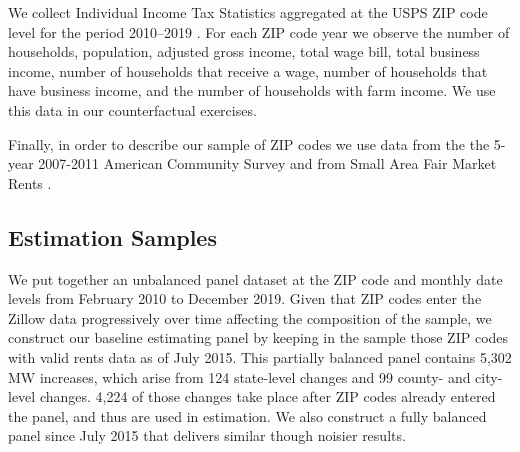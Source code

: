 We collect Individual Income Tax Statistics aggregated at the USPS ZIP code 
level for the period 2010--2019 \parencite{IRS}.
For each ZIP code year we observe the number of households, population, adjusted 
gross income, total wage bill, total business income, number of households that 
receive a wage, number of households that have business income, and the number 
of households with farm income.
We use this data in our counterfactual exercises.

Finally, in order to describe our sample of ZIP codes we use data from the 
the 5-year 2007-2011 American Community Survey \parencite[ACS;][]{ACS} and from 
Small Area Fair Market Rents \parencite[SAFMR;][]{hudSAFMR}.



\subsection{Estimation Samples}\label{sec:data_final_panel}

We put together an unbalanced panel dataset at the ZIP code and monthly date 
levels from February 2010 to December 2019.
Given that ZIP codes enter the Zillow data progressively over time affecting 
the composition of the sample,
we construct our baseline estimating panel by keeping in the sample those ZIP 
codes with valid rents data as of July 2015.
This partially balanced panel contains 5,302 MW increases, which arise from 
124 state-level changes and 99 county- and city-level changes.
4,224 of those changes take place after ZIP codes already entered the panel, 
and thus are used in estimation.
We also construct a fully balanced panel since July 2015 that delivers similar 
though noisier results.

